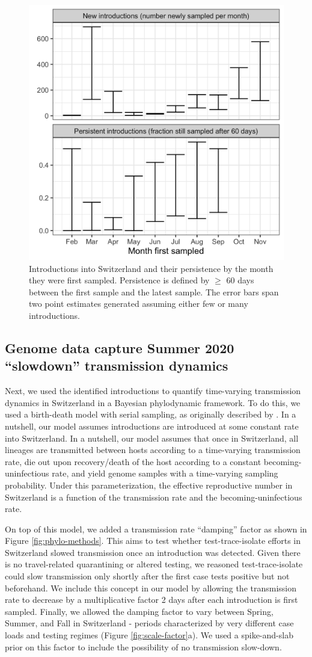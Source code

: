 \documentclass[9pt,twoside,lineno]{pnas-new} %
\begin{document}
\begin{figure}[H]
\centering
\includegraphics[width=.4\linewidth]{figures/introductions_and_persistance.png}
\caption{Introductions into Switzerland and their persistence by the month they were first sampled. Persistence is defined by $\geq$ 60 days between the first sample and the latest sample. The error bars span two point estimates generated assuming either few or many introductions.}
\label{fig:chain-longevity}
\end{figure}

\subsection{Genome data capture Summer 2020 ``slowdown'' transmission dynamics}

Next, we used the identified introductions to quantify time-varying transmission dynamics in Switzerland in a Bayesian phylodynamic framework. To do this, we used a birth-death model with serial sampling, as originally described by \cite{stadler_2010_bds}. In a nutshell, our model assumes introductions are introduced at some constant rate into Switzerland. In a nutshell, our model assumes that once in Switzerland, all lineages are transmitted between hosts according to a time-varying transmission rate, die out upon recovery/death of the host according to a constant becoming-uninfectious rate, and yield genome samples with a time-varying sampling probability. Under this parameterization, the effective reproductive number in Switzerland is a function of the transmission rate and the becoming-uninfectious rate.

On top of this model, we added a transmission rate ``damping'' factor as shown in Figure \ref{fig:phylo-methods}. This aims to test whether test-trace-isolate efforts in Switzerland slowed transmission once an introduction was detected. Given there is no travel-related quarantining or altered testing, we reasoned test-trace-isolate could slow transmission only shortly after the first case tests positive but not beforehand. We include this concept in our model by allowing the transmission rate to decrease by a multiplicative factor 2 days after each introduction is first sampled. Finally, we allowed the damping factor to vary between Spring, Summer, and Fall in Switzerland - periods characterized by very different case loads and testing regimes (Figure \ref{fig:scale-factor}a). We used a spike-and-slab prior on this factor to include the possibility of no transmission slow-down. 
\end{document}
